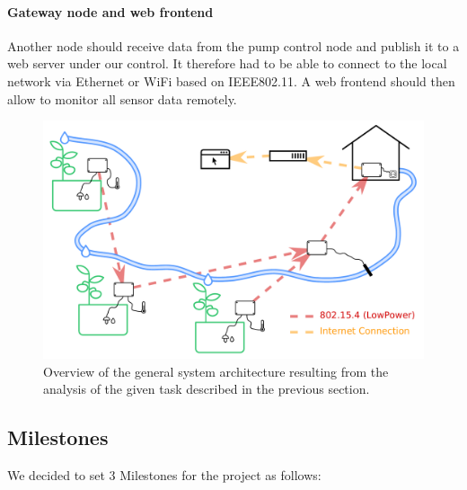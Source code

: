 \documentclass[11pt,paper=a4,parskip=half]{scrartcl}
\begin{document}
  \paragraph{Gateway node and web frontend} Another node should receive data
  from the pump control node and publish it to a web server under our control.
  It therefore had to be able to connect to the local network via Ethernet or
  WiFi based on IEEE802.11. A web frontend should then allow to monitor all
  sensor data remotely.

  \begin{figure}[h]
    \centering
    \includegraphics[scale=0.4]{schema}
	  \caption{Overview of the general system architecture resulting from
	  the analysis of the given task described in the previous section.}
    \label{fig:schema}
  \end{figure}

\subsection{Milestones}
  We decided to set 3 Milestones for the project as follows:
\end{document}
